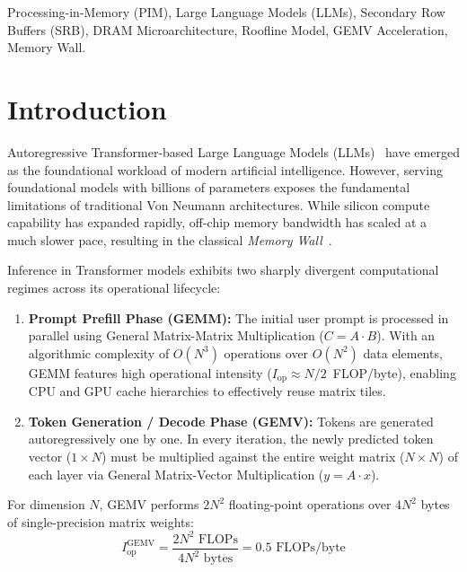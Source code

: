 \documentclass[conference]{IEEEtran}
\begin{document}
\begin{IEEEkeywords}
Processing-in-Memory (PIM), Large Language Models (LLMs), Secondary Row Buffers (SRB), DRAM Microarchitecture, Roofline Model, GEMV Acceleration, Memory Wall.
\end{IEEEkeywords}

\section{Introduction}
\label{sec:intro}
Autoregressive Transformer-based Large Language Models (LLMs)~\cite{touvron2023llama, brown2020language} have emerged as the foundational workload of modern artificial intelligence. However, serving foundational models with billions of parameters exposes the fundamental limitations of traditional Von Neumann architectures. While silicon compute capability has expanded rapidly, off-chip memory bandwidth has scaled at a much slower pace, resulting in the classical \textit{Memory Wall}~\cite{mutlu2019processing}.

Inference in Transformer models exhibits two sharply divergent computational regimes across its operational lifecycle:
\begin{enumerate}
    \item \textbf{Prompt Prefill Phase (GEMM):} The initial user prompt is processed in parallel using General Matrix-Matrix Multiplication ($C = A \cdot B$). With an algorithmic complexity of $O(N^3)$ operations over $O(N^2)$ data elements, GEMM features high operational intensity ($I_{\text{op}} \approx N/2$~FLOP/byte), enabling CPU and GPU cache hierarchies to effectively reuse matrix tiles.
    \item \textbf{Token Generation / Decode Phase (GEMV):} Tokens are generated autoregressively one by one. In every iteration, the newly predicted token vector ($1 \times N$) must be multiplied against the entire weight matrix ($N \times N$) of each layer via General Matrix-Vector Multiplication ($y = A \cdot x$).
\end{enumerate}

For dimension $N$, GEMV performs $2N^2$ floating-point operations over $4N^2$ bytes of single-precision matrix weights:
\begin{equation}
    I_{\text{op}}^{\text{GEMV}} = \frac{2N^2\text{ FLOPs}}{4N^2\text{ bytes}} = 0.5\text{ FLOPs/byte}
    \label{eq:gemv_intensity}
\end{equation}
\end{document}
